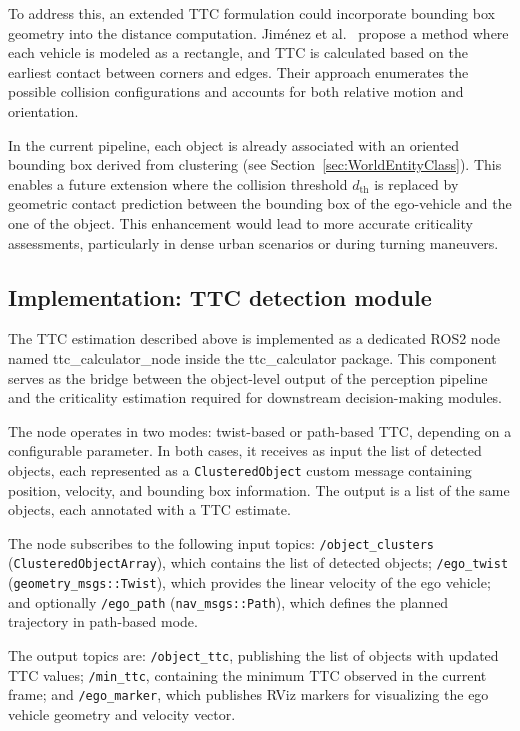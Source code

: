 To address this, an extended TTC formulation could incorporate 
bounding box geometry into the distance computation. Jiménez 
et al.~\cite{improvedTTC} propose a method where each 
vehicle is modeled as a rectangle, and TTC is calculated based on 
the earliest contact between corners and edges. Their approach 
enumerates the possible collision configurations and accounts 
for both relative motion and orientation.

In the current pipeline, each object is already associated with an 
oriented bounding box derived from clustering (see 
Section~\ref{sec:WorldEntityClass}). This enables a future 
extension where the collision threshold $d_{\text{th}}$ is replaced 
by geometric contact prediction between the bounding box of the ego-vehicle and the one of the object. This enhancement would 
lead to more accurate criticality assessments, particularly in 
dense urban scenarios or during turning maneuvers.

\subsection{Implementation: TTC detection module}
\label{sec:TTCImplementation}

The TTC estimation described above is implemented as a dedicated 
ROS2 node named ttc\_calculator\_node inside the ttc\_calculator package. This component 
serves as the bridge between the object-level output of the 
perception pipeline and the criticality estimation required for 
downstream decision-making modules.

The node operates in two modes: twist-based or path-based TTC, 
depending on a configurable parameter. In both cases, it receives 
as input the list of detected objects, each represented as a 
\texttt{ClusteredObject} custom message containing position, velocity, and 
bounding box information. The output is a list of the same objects, 
each annotated with a TTC estimate.

The node subscribes to the following input topics:
\texttt{/object\_clusters} (\texttt{ClusteredObjectArray}), which 
contains the list of detected objects; 
\texttt{/ego\_twist} (\texttt{geometry\_msgs::Twist}), which 
provides the linear velocity of the ego vehicle; and optionally 
\texttt{/ego\_path} (\texttt{nav\_msgs::Path}), which defines the 
planned trajectory in path-based mode.



The output topics are:
\texttt{/object\_ttc}, publishing the list of objects with updated 
TTC values;
\texttt{/min\_ttc}, containing the minimum TTC observed in the 
current frame;
and \texttt{/ego\_marker}, which publishes RViz markers for 
visualizing the ego vehicle geometry and velocity vector.


